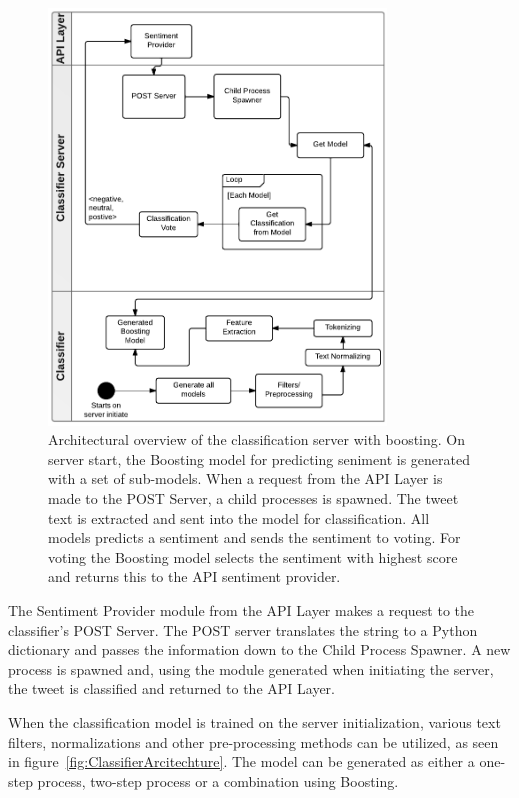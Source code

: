 \begin{figure}[htb]
 \begin{center}
     \includegraphics[width=0.8\textwidth]{../img/ClassifierArcitechture30Boosting.pdf}
 \end{center}
 \caption[Architectural overview of the classification server with Boosting.]{Architectural overview of the classification server with boosting. On server start, the Boosting model for predicting seniment is generated with a set of sub-models. When a request from the API Layer is made to the POST Server, a child processes is spawned. The tweet text is extracted and sent into the model for classification. All models predicts a sentiment and sends the sentiment to voting. For voting the Boosting model selects the sentiment with highest score and returns this to the API sentiment provider.}
 \label{fig:ClassifierArcitechtureBoosting}
\end{figure}

The Sentiment Provider module from the API Layer makes a request to the classifier's POST Server. The POST server translates the string to a Python dictionary and passes the information down to the Child Process Spawner. A new process is spawned and, using the module generated when initiating the server, the tweet is classified and returned to the API Layer.

When the classification model is trained on the server initialization, various text filters, normalizations and other pre-processing methods can be utilized, as seen in figure~\ref{fig:ClassifierArcitechture}. The model can be generated as either a one-step process, two-step process or a combination using Boosting. 

